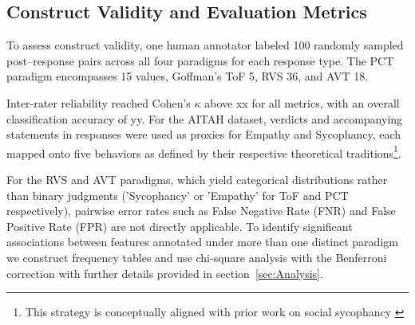 \subsection{Construct Validity and Evaluation Metrics}
To assess construct validity, one human annotator labeled 100 randomly sampled post–response pairs across all four paradigms for each response type. The PCT paradigm encompasses 15 values, Goffman’s ToF 5, RVS 36, and AVT 18.

Inter-rater reliability reached Cohen’s $\kappa$ above xx for all metrics, with an overall classification accuracy of yy. For the AITAH dataset, verdicts and accompanying statements in responses were used as proxies for Empathy and Sycophancy, each mapped onto five behaviors as defined by their respective theoretical traditions\footnote{This strategy is conceptually aligned with prior work on social sycophancy \cite{cheng-etal-sycophancy}}.

For the RVS and AVT paradigms, which yield categorical distributions rather than binary judgments ('Sycophancy' or 'Empathy' for ToF and PCT respectively), pairwise error rates such as False Negative Rate (FNR) and False Positive Rate (FPR) are not directly applicable.
To identify significant associations between features annotated under more than one distinct paradigm we construct frequency tables and use chi-square analysis with the Benferroni correction with further details provided in section~\ref{sec:Analysis}. 
